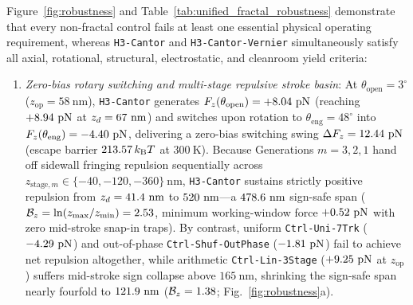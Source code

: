 \documentclass[pdflatex,sn-nature]{sn-jnl}
\begin{document}
Figure~\ref{fig:robustness} and Table~\ref{tab:unified_fractal_robustness} demonstrate that every non-fractal control fails at least one essential physical operating requirement, whereas \texttt{H3-Cantor} and \texttt{H3-Cantor-Vernier} simultaneously satisfy all axial, rotational, structural, electrostatic, and cleanroom yield criteria:
\begin{enumerate}
    \item \emph{Zero-bias rotary switching and multi-stage repulsive stroke basin}: At $\theta_{\mathrm{open}}=3^\circ$ ($z_{\mathrm{op}}=58\ \mathrm{nm}$), \texttt{H3-Cantor} generates $F_z(\theta_{\mathrm{open}}) = +8.04{}\ \mathrm{pN}$ (reaching $+8.94{}\ \mathrm{pN}$ at $z_d = \HthreeSymZPeakNmDisp{}\ \mathrm{nm}$) and switches upon rotation to $\theta_{\mathrm{eng}}=48^\circ$ into $F_z(\theta_{\mathrm{eng}}) = -4.40{}\ \mathrm{pN}$, delivering a zero-bias switching swing $\Delta F_z = 12.44{}\ \mathrm{pN}$ (escape barrier $213.57{}\,k_{\mathrm{B}}T$ at $300\ \mathrm{K}$). Because Generations $m=3,2,1$ hand off sidewall fringing repulsion sequentially across $z_{\mathrm{stage},m} \in \{-40,-120,-360\}\ \mathrm{nm}$, \texttt{H3-Cantor} sustains strictly positive repulsion from $z_d = \HthreeSymZSafeMinNmDisp{}\ \mathrm{nm}$ to $520{}\ \mathrm{nm}$---a $478.6{}\ \mathrm{nm}$ sign-safe span ($\mathcal{B}_z = \ln(z_{\max}/z_{\min}) = 2.53{}$, minimum working-window force $\RobTblHthreeCantorSymTwoxtwoxtwoMinFz{}\ \mathrm{pN}$ with zero mid-stroke snap-in traps). By contrast, uniform \texttt{Ctrl-Uni-7Trk} ($\RobTblCtrlUniSeventrkFzOpen{}\ \mathrm{pN}$) and out-of-phase \texttt{Ctrl-Shuf-OutPhase} ($\RobTblCtrlShufOutphaseFzOpen{}\ \mathrm{pN}$) fail to achieve net repulsion altogether, while arithmetic \texttt{Ctrl-Lin-3Stage} ($\RobTblCtrlLinThreestageFzOpen{}\ \mathrm{pN}$ at $z_{\mathrm{op}}$) suffers mid-stroke sign collapse above $165\ \mathrm{nm}$, shrinking the sign-safe span nearly fourfold to $\RobTblCtrlLinThreestageSpanNm{}\ \mathrm{nm}$ ($\mathcal{B}_z = 1.38{}$; Fig.~\ref{fig:robustness}a).

\end{enumerate}
\end{document}
